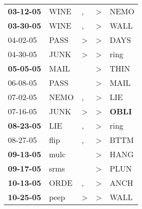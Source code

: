\begin{supertabular}{p{0.07\textwidth}p{0.06\textwidth}p{0.02\textwidth}p{0.02\textwidth}p{0.06\textwidth}}
 \textbf{03-12-05\textsuperscript{}} &           WINE\textsuperscript{} &                , &     \textgreater &           NEMO\textsuperscript{} \\
 \textbf{03-30-05\textsuperscript{}} &           WINE\textsuperscript{} &                , &     \textgreater &           WALL\textsuperscript{} \\
          04-02-05\textsuperscript{} &           PASS\textsuperscript{} &     \textgreater &     \textgreater &           DAYS\textsuperscript{} \\
          04-30-05\textsuperscript{} &           JUNK\textsuperscript{} &     \textgreater &     \textgreater &           ring\textsuperscript{} \\
 \textbf{05-05-05\textsuperscript{}} &           MAIL\textsuperscript{} &                  &     \textgreater &           THIN\textsuperscript{} \\
          06-08-05\textsuperscript{} &           PASS\textsuperscript{} &                  &     \textgreater &           MAIL\textsuperscript{} \\
          07-02-05\textsuperscript{} &           NEMO\textsuperscript{} &                , &     \textgreater &            LIE\textsuperscript{} \\
          07-16-05\textsuperscript{} &           JUNK\textsuperscript{} &     \textgreater &     \textgreater &  \textbf{OBLI\textsuperscript{}} \\
 \textbf{08-23-05\textsuperscript{}} &            LIE\textsuperscript{} &                , &     \textgreater &           ring\textsuperscript{} \\
          08-27-05\textsuperscript{} &           flip\textsuperscript{} &                , &     \textgreater &           BTTM\textsuperscript{} \\
 \textbf{09-13-05\textsuperscript{}} &           mulc\textsuperscript{} &                  &     \textgreater &           HANG\textsuperscript{} \\
 \textbf{09-17-05\textsuperscript{}} &           srms\textsuperscript{} &                  &     \textgreater &           PLUN\textsuperscript{} \\
 \textbf{10-13-05\textsuperscript{}} &           ORDE\textsuperscript{} &                , &     \textgreater &           ANCH\textsuperscript{} \\
 \textbf{10-25-05\textsuperscript{}} &           peep\textsuperscript{} &     \textgreater &     \textgreater &           WALL\textsuperscript{} \\

\end{supertabular}
